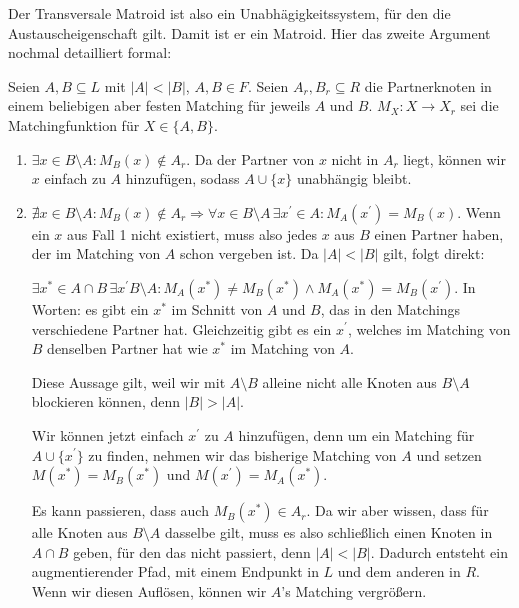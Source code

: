Der Transversale Matroid ist also ein Unabhägigkeitssystem, für den die Austauscheigenschaft gilt. Damit ist er ein Matroid. 
Hier das zweite Argument nochmal detailliert formal:

Seien $A,B \subseteq L$ mit $|A| < |B|$, $A,B \in F$. Seien $A_r, B_r \subseteq R$ die Partnerknoten in einem beliebigen aber festen Matching für jeweils $A$ und $B$. $M_X \colon X \rightarrow X_r$ sei die Matchingfunktion für $X \in \{A,B\}$.

\begin{enumerate}
    \item $\exists x \in B \setminus A \colon M_B(x) \notin A_r$. Da der Partner von $x$ nicht in $A_r$ liegt, können wir $x$ einfach zu $A$ hinzufügen, sodass $A \cup \{x\}$ unabhängig bleibt.
    \item $\nexists x \in B \setminus A \colon M_B(x) \notin A_r \Rightarrow \forall x \in B \setminus A \, \exists x^\prime \in A \colon M_A(x^\prime) = M_B(x)$. Wenn ein $x$ aus Fall 1 nicht existiert, muss also jedes $x$ aus $B$ einen Partner haben, der im Matching von $A$ schon vergeben ist. Da $|A| < |B|$ gilt, folgt direkt:

    $\exists x^* \in A \cap B \, \exists x^\prime B \setminus A \colon M_A(x^*) \neq M_B(x^*) \wedge M_A(x^*) = M_B(x^\prime)$. In Worten: es gibt ein $x^*$ im Schnitt von $A$ und $B$, das in den Matchings verschiedene Partner hat. Gleichzeitig gibt es ein $x^\prime$, welches im Matching von $B$ denselben Partner hat wie $x^*$ im Matching von $A$.

    Diese Aussage gilt, weil wir mit $A \setminus B$ alleine nicht alle Knoten aus $B \setminus A$ blockieren können, denn $|B|>|A|$.

    Wir können jetzt einfach $x^\prime$ zu $A$ hinzufügen, denn um ein Matching für $A \cup \{x^\prime\}$ zu finden, nehmen wir das bisherige Matching von $A$ und setzen $M(x^*) = M_B(x^*)$ und $M(x^\prime) = M_A(x^*)$.

    Es kann passieren, dass auch $M_B(x^*) \in A_r$. Da wir aber wissen, dass für alle Knoten aus $B \setminus A$ dasselbe gilt, muss es also schließlich einen Knoten in $A \cap B$ geben, für den das nicht passiert, denn $|A| < |B|$. Dadurch entsteht ein augmentierender Pfad, mit einem Endpunkt in $L$ und dem anderen in $R$. Wenn wir diesen Auflösen, können wir $A$'s Matching vergrößern.
\end{enumerate}

\subexercise



